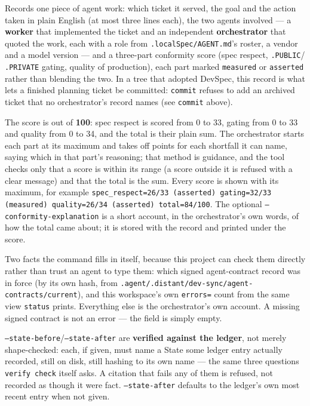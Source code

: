 Records one piece of agent work: which ticket it served, the goal and the
action taken in plain English (at most three lines each), the two agents
involved --- a \textbf{worker} that implemented the ticket and an
independent \textbf{orchestrator} that quoted the work, each with a role
from \texttt{.localSpec/AGENT.md}'s roster, a vendor and a model version
--- and a three-part conformity score (spec respect, \texttt{.PUBLIC}/
\texttt{.PRIVATE} gating, quality of production), each part marked
\texttt{measured} or \texttt{asserted} rather than blending the two.
In a tree that adopted DevSpec, this record is what lets a finished
planning ticket be committed: \texttt{commit} refuses to add an archived
ticket that no orchestrator's record names (see \texttt{commit} above).

The score is out of \textbf{100}: spec respect is scored from 0 to 33,
gating from 0 to 33 and quality from 0 to 34, and the total is their plain
sum. The orchestrator starts each part at its maximum and takes off points
for each shortfall it can name, saying which in that part's reasoning; that
method is guidance, and the tool checks only that a score is within its
range (a score outside it is refused with a clear message) and that the
total is the sum. Every score is shown with its maximum,
for example \texttt{spec\_respect=26/33 (asserted) gating=32/33 (measured)
quality=26/34 (asserted) total=84/100}. The optional
\texttt{--conformity-explanation} is a short account, in the orchestrator's
own words, of how the total came about; it is stored with the record and
printed under the score.

Two facts the command fills in itself, because this project can check them
directly rather than trust an agent to type them: which signed
agent-contract record was in force (by its own hash, from
\texttt{.agent/.distant/dev-sync/agent-contracts/current}), and this
workspace's own \texttt{errors=} count from the same view \texttt{status}
prints. Everything else is the orchestrator's own account. A missing
signed contract is not an error --- the field is simply empty.

\texttt{--state-before}/\texttt{--state-after} are \textbf{verified against
the ledger}, not merely shape-checked: each, if given, must name a State
some ledger entry actually recorded, still on disk, still hashing to its
own name --- the same three questions \texttt{verify check} itself asks. A
citation that fails any of them is refused, not recorded as though it were
fact. \texttt{--state-after} defaults to the ledger's own most recent
entry when not given.

